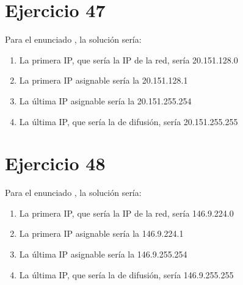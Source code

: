 \documentclass[letterpaper,10pt,spanish]{sphinxmanual}
\begin{document}
\section{Ejercicio 47}
\label{\detokenize{t2_integracion_elementos/ejercicios_subredes_ipv4/rangos_direcciones:id47}}
\sphinxAtStartPar
Para el enunciado , la solución sería:
\begin{enumerate}
%
\item {} 
\sphinxAtStartPar
La primera IP, que sería la IP de la red, sería 20.151.128.0

\item {} 
\sphinxAtStartPar
La primera IP asignable sería la 20.151.128.1

\item {} 
\sphinxAtStartPar
La última IP asignable sería la 20.151.255.254

\item {} 
\sphinxAtStartPar
La última IP, que sería la de difusión, sería 20.151.255.255

\end{enumerate}


\section{Ejercicio 48}
\label{\detokenize{t2_integracion_elementos/ejercicios_subredes_ipv4/rangos_direcciones:id48}}
\sphinxAtStartPar
Para el enunciado , la solución sería:
\begin{enumerate}
%
\item {} 
\sphinxAtStartPar
La primera IP, que sería la IP de la red, sería 146.9.224.0

\item {} 
\sphinxAtStartPar
La primera IP asignable sería la 146.9.224.1

\item {} 
\sphinxAtStartPar
La última IP asignable sería la 146.9.255.254

\item {} 
\sphinxAtStartPar
La última IP, que sería la de difusión, sería 146.9.255.255

\end{enumerate}
\end{document}
